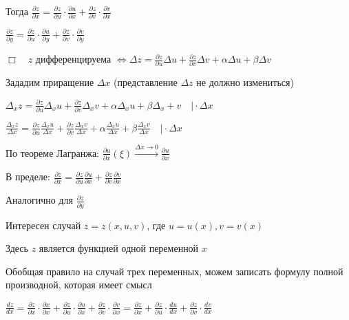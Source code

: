 \documentclass[12pt]{article}
\begin{document}
    Тогда $\displaystyle \frac{\partial z}{\partial x} = \frac{\partial z}{\partial u} \cdot \frac{\partial u}{\partial x} + \frac{\partial z}{\partial v} \cdot \frac{\partial v}{\partial x}$

    $\displaystyle \frac{\partial z}{\partial y} = \frac{\partial z}{\partial u} \cdot \frac{\partial u}{\partial y} + \frac{\partial z}{\partial v} \cdot \frac{\partial v}{\partial y}$

    $\displaystyle \Box \quad z$ дифференцируема $\displaystyle \Longleftrightarrow \Delta z = \frac{\partial z}{\partial u} \Delta u + \frac{\partial z}{\partial v} \Delta v + \alpha \Delta u + \beta \Delta v$

    Зададим приращение $\displaystyle \Delta x$ (представление $\displaystyle \Delta z$ не должно измениться)

    $\displaystyle \Delta_x z = \frac{\partial z}{\partial u} \Delta_x u + \frac{\partial z}{\partial v} \Delta_x v + \alpha \Delta_x u + \beta \Delta_x + v \quad \Big| \cdot \Delta x$

    $\displaystyle \frac{\Delta_x z}{\Delta x} = \frac{\partial z}{\partial u} \frac{\Delta_x u}{\Delta x} + \frac{\partial z}{\partial v} \frac{\Delta_x v}{\Delta x} + \alpha \frac{\Delta_x u}{\Delta x} + \beta \frac{\Delta_x v}{\Delta x} \quad \Big| \cdot \Delta x$

    По теореме Лагранжа: $\displaystyle \frac{\partial u}{\partial x}(\xi) \stackrel{\Delta x \to 0}{\rightarrow} \frac{\partial u}{\partial x}$

    В пределе: $\displaystyle \frac{\partial z}{\partial x} = \frac{\partial z}{\partial u} \frac{\partial u}{\partial x} + \frac{\partial z}{\partial v} \frac{\partial v}{\partial x}$

    Аналогично для $\displaystyle \frac{\partial z}{\partial y}$

    \hypertarget{completederivativeoffunctionoftwovariables}{}

    \Nota Интересен случай $\displaystyle z = z(x, u, v)$, где $\displaystyle u = u(x), v = v(x)$

    Здесь $\displaystyle z$ является функцией одной переменной $\displaystyle x$

    Обобщая правило на случай трех переменных, можем записать формулу полной производной, которая имеет смысл

    $\displaystyle \frac{dz}{dx} = \frac{\partial z}{\partial x} \cdot \frac{\partial x}{\partial x} +
    \frac{\partial z}{\partial u} \cdot \frac{\partial u}{\partial x} +
    \frac{\partial z}{\partial v} \cdot \frac{\partial v}{\partial x} =
    \frac{\partial z}{\partial x} +
    \frac{\partial z}{\partial u} \cdot \frac{du}{dx} +
    \frac{\partial z}{\partial v} \cdot \frac{dv}{dx}
    $
\end{document}
